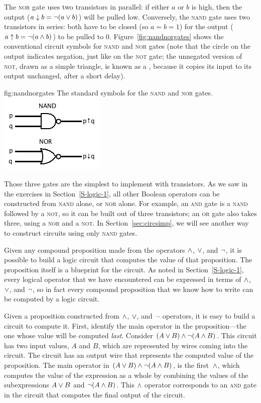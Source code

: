 The \textsc{nor} gate uses two transistors in parallel: if either $a$ or $b$ is
high, then the output ($a\downarrow b=\lnot(a\vee b)$) will be pulled low. Conversely, the \textsc{nand} gate
uses two transistors in series: both have to be closed (so $a=b=1$) for the
output ($a\uparrow b=\lnot(a\wedge b)$) to be pulled to 0. Figure~\ref{fig:nandnorgates} shows the conventional
circuit symbols for \textsc{nand} and \textsc{nor} gates (note that the circle
on the output indicates negation, just like on the \textsc{not} gate; the
unnegated version of \textsc{not}, drawn as a simple triangle, is known as a
, because it copies its input to its output unchanged, after a short delay).

\fig
	{fig:nandnorgates}
	{The standard symbols for the \textsc{nand} and \textsc{nor} gates.}
	{\includegraphics[width=!,height=!,scale=0.75]{graphics/NandNor.png}}

Those three gates are the simplest to implement with transistors. As we saw in the
exercises in Section~\ref{S-logic-1}, all other Boolean operators can be constructed
from \textsc{nand} alone, or \textsc{nor} alone. For example, an \textsc{and} gate is
a \textsc{nand} followed by a \textsc{not}, so it can be built out of three transistors;
an \textsc{or} gate also takes three, using a \textsc{nor} and a \textsc{not}.
In Section~\ref{sec:circsimp}, we will see another way to construct circuits using only \textsc{nand} gates.

\medskip

Given any compound proposition made from the operators
$\wedge$, $\vee$, and $\lnot$, it is possible to build a logic
circuit
that computes the value of that proposition.  The
proposition itself is a blueprint for the circuit.  As noted
in Section~\ref{S-logic-1}, every logical operator that we have 
encountered can be expressed in terms of $\wedge$, $\vee$, and $\lnot$,
so in fact every compound proposition that we know how to write
can be computed by a logic circuit. 

Given a proposition constructed
from $\wedge$, $\vee$, and $\lnot$ operators, it is
easy to build a circuit to compute it.  First, identify the main
operator in the proposition---the one whose value will be
computed \emph{last}.  Consider $(A\vee B)\wedge\lnot(A\wedge B)$.
This circuit has two input values, $A$ and $B$, which are represented
by wires coming into the circuit.  The circuit has an output wire
that represents the computed value of the proposition.
The main operator in $(A\vee B)\wedge\lnot(A\wedge B)$,
is the first~$\wedge$, which computes the
value of the expression as a whole by combining the values
of the subexpressions $A\vee B$ and $\lnot(A\wedge B)$.  This $\wedge$
operator corresponds to an \textsc{and} gate in the circuit that
computes the final output of the circuit.

